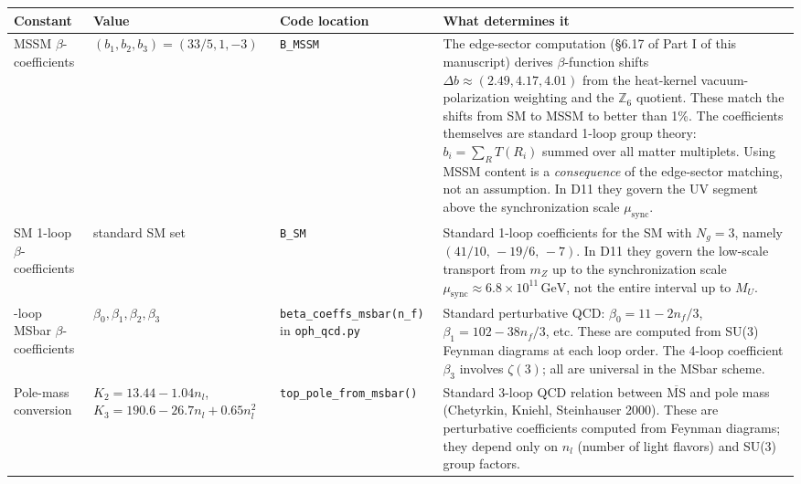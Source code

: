 {\def\LTcaptype{none} %
\setlength{\LTleft}{0pt}
\setlength{\LTright}{0pt}
\setlength{\tabcolsep}{1.2pt}
\renewcommand{\arraystretch}{1.05}
\footnotesize
\begin{longtable}[]{@{}>{\RaggedRight\arraybackslash}p{}>{\RaggedRight\arraybackslash}p{}>{\RaggedRight\arraybackslash}p{}>{\RaggedRight\arraybackslash}p{}@{}}
\toprule\noalign{}
Constant & Value & Code location & What determines it \\
\midrule\noalign{}
\endhead
\bottomrule\noalign{}
\endlastfoot
MSSM \(\beta\)-coefficients & \((b_1, b_2, b_3) = (33/5, 1, -3)\) & \texttt{B\_MSSM} & The edge-sector computation (\S{}6.17 of Part I of this manuscript) derives \(\beta\)-function shifts \(\Delta b \approx (2.49, 4.17, 4.01)\) from the heat-kernel vacuum-polarization weighting and the \(\mathbb{Z}_6\) quotient. These match the shifts from SM to MSSM to better than 1\%. The coefficients themselves are standard 1-loop group theory: \(b_i = \sum_R T(R_i)\) summed over all matter multiplets. Using MSSM content is a \emph{consequence} of the edge-sector matching, not an assumption. In D11 they govern the UV segment above the synchronization scale \(\mu_{\mathrm{sync}}\). \\
SM 1-loop \(\beta\)-coefficients & standard SM set & \texttt{B\_SM} & Standard 1-loop coefficients for the SM with \(N_g = 3\), namely \((41/10,\,-19/6,\,-7)\). In D11 they govern the low-scale transport from \(m_Z\) up to the synchronization scale \(\mu_{\mathrm{sync}}\approx 6.8\times 10^{11}\,\mathrm{GeV}\), not the entire interval up to \(M_U\). \\
4-loop MSbar \(\beta\)-coefficients & \(\beta_0, \beta_1, \beta_2, \beta_3\) & \texttt{beta\_\allowbreak coeffs\_\allowbreak msbar(n\_\allowbreak f)} in \texttt{oph\_\allowbreak qcd.py} & Standard perturbative QCD: \(\beta_0 = 11 - 2n_f/3\), \(\beta_1 = 102 - 38n_f/3\), etc. These are computed from SU(3) Feynman diagrams at each loop order. The 4-loop coefficient \(\beta_3\) involves \(\zeta(3)\); all are universal in the MSbar scheme. \\
Pole-mass conversion & \(K_2 = 13.44 - 1.04 n_l\), \(K_3 = 190.6 - 26.7 n_l + 0.65 n_l^2\) & \texttt{top\_\allowbreak pole\_\allowbreak from\_\allowbreak msbar()} & Standard 3-loop QCD relation between \(\overline{\text{MS}}\) and pole mass (Chetyrkin, Kniehl, Steinhauser 2000). These are perturbative coefficients computed from Feynman diagrams; they depend only on \(n_l\) (number of light flavors) and SU(3) group factors. \\

\end{longtable}}
